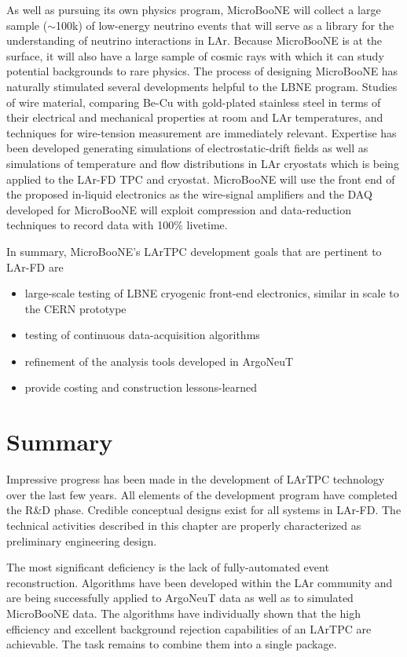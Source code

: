 As well as pursuing its own physics program, MicroBooNE will collect a large sample ($\sim$100k) of low-energy neutrino events that will serve as a library for the understanding of neutrino interactions in 
LAr. Because MicroBooNE is at the surface, it will also have a large sample of cosmic rays with which it can study potential backgrounds to rare physics. The process of designing MicroBooNE has naturally stimulated several developments helpful to the LBNE program.  Studies of wire material, comparing Be-Cu with gold-plated stainless steel in terms of their electrical and mechanical properties at room and LAr temperatures, and techniques for wire-tension measurement are immediately relevant. Expertise has been developed generating simulations of electrostatic-drift fields as well as simulations of temperature and flow distributions in LAr cryostats which is being applied to the LAr-FD TPC and cryostat. MicroBooNE will use the front end of the proposed in-liquid electronics as the wire-signal amplifiers and the DAQ developed for MicroBooNE will exploit compression and data-reduction techniques to record data with 100\% livetime.

\noindent  In summary, MicroBooNE's LArTPC development goals that are pertinent to LAr-FD are
\begin{itemize}
\item large-scale testing of LBNE cryogenic front-end electronics, similar in scale to the CERN prototype
\item testing of continuous data-acquisition algorithms
\item refinement of the analysis tools developed in ArgoNeuT
\item provide costing and construction lessons-learned
\end{itemize}

\section{Summary}

Impressive progress has been made in the development of LArTPC technology over the last few years. All elements of the development program have completed the R\&D phase. Credible conceptual designs exist for all systems in LAr-FD. The technical activities described in this chapter are properly characterized as preliminary engineering design.

The most significant deficiency is the lack of fully-automated event reconstruction. Algorithms have been developed within the LAr community and are being successfully applied to ArgoNeuT data as well as to simulated MicroBooNE data. The algorithms have individually shown that the high efficiency and excellent background rejection capabilities of an LArTPC are achievable. The task remains to combine them into a single package. 



